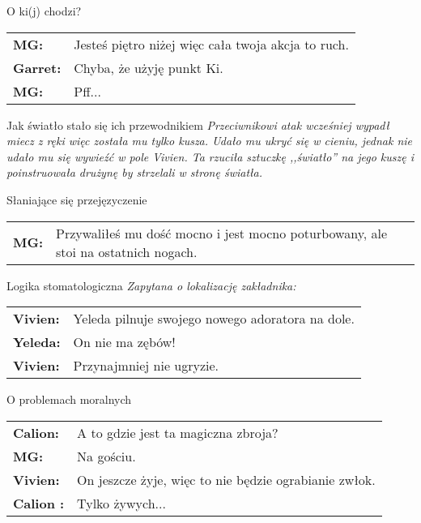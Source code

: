 \documentclass[10pt,twoside,twocolumn]{book}
\begin{document}
\begin{rpg-quotebox}{O ki(j) chodzi?}
   \begin{tabularx}{\columnwidth}{lX}
      \textbf{MG:} & Jesteś piętro niżej więc cała twoja akcja to ruch.\\
      \textbf{Garret:} & Chyba, że użyję punkt Ki.\\
      \textbf{MG:} & Pff...\\
   \end{tabularx}
\end{rpg-quotebox}

\begin{rpg-quotebox}{Jak światło stało się ich przewodnikiem}
   \textit{Przeciwnikowi atak wcześniej wypadł miecz z ręki więc została mu tylko kusza. Udało mu ukryć się w cieniu, jednak nie udało mu się wywieźć w pole Vivien. Ta rzuciła sztuczkę ,,światło'' na jego kuszę i poinstruowała drużynę by strzelali w stronę światła.}
\end{rpg-quotebox}


\begin{rpg-quotebox}{Słaniające się przejęzyczenie}
   \begin{tabularx}{\columnwidth}{lX}
      \textbf{MG:} & Przywaliłeś mu dość mocno i jest mocno poturbowany, ale stoi na ostatnich nogach.\\
   \end{tabularx}
\end{rpg-quotebox}


\begin{rpg-quotebox}{Logika stomatologiczna}
   \textit{Zapytana o lokalizację zakładnika:} \\

   \begin{tabularx}{\columnwidth}{lX}
      \textbf{Vivien:} & Yeleda pilnuje swojego nowego adoratora na dole.\\
      \textbf{Yeleda:} & On nie ma zębów!\\
      \textbf{Vivien:} & Przynajmniej nie ugryzie.\\
   \end{tabularx}
\end{rpg-quotebox}


\begin{rpg-quotebox}{O problemach moralnych}
   \begin{tabularx}{\columnwidth}{lX}
      \textbf{Calion:} & A to gdzie jest ta magiczna zbroja?\\
      \textbf{MG:} & Na gościu.\\
      \textbf{Vivien:} & On jeszcze żyje, więc to nie będzie ograbianie zwłok.\\
      \textbf{Calion :} & Tylko żywych...\\
   \end{tabularx}
\end{rpg-quotebox}
\end{document}
